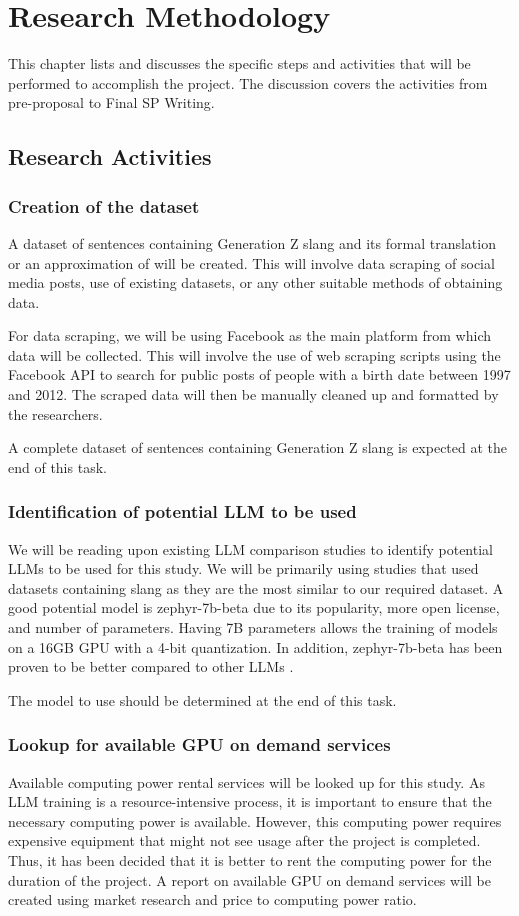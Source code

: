 \chapter{Research Methodology}
This chapter lists and discusses the specific steps and activities that will be performed to accomplish the project. 
The discussion covers the activities from pre-proposal to Final SP Writing.

\section{Research Activities}
\subsection{Creation of the dataset} 
A dataset of sentences containing Generation Z slang and its formal translation or an approximation of will be created. This will involve data scraping of social media posts, use of existing datasets, or any other suitable methods of obtaining data.

For data scraping, we will be using Facebook as the main platform from which data will be collected.
This will involve the use of web scraping scripts using the Facebook API to search for public posts of people with a birth date between 1997 and 2012. The scraped data will then be manually cleaned up and formatted by the researchers.

A complete dataset of sentences containing Generation Z slang is expected at the end of this task. 

\subsection{Identification of potential LLM to be used}
We will be reading upon existing LLM comparison studies to identify potential LLMs to be used for this study.
We will be primarily using studies that used datasets containing slang as they are the most similar to our required dataset.
A good potential model is zephyr-7b-beta due to its popularity, more open license, and number of parameters.
Having 7B parameters allows the training of models on a 16GB GPU with a 4-bit quantization.
In addition, zephyr-7b-beta has been proven to be better compared to other LLMs \cite{Zhu_2023} \cite{zhao2024loraland310finetuned}.

The model to use should be determined at the end of this task.

\subsection{Lookup for available GPU on demand services} 
Available computing power rental services will be looked up for this study.
As LLM training is a resource-intensive process, it is important to ensure that the necessary computing power is available.
However, this computing power requires expensive equipment that might not see usage after the project is completed.
Thus, it has been decided that it is better to rent the computing power for the duration of the project.
A report on available GPU on demand services will be created using market research and price to computing power ratio.

